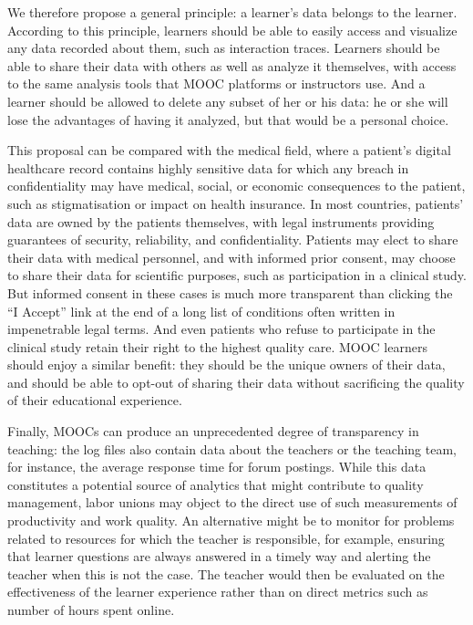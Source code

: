 
We therefore propose a general principle: a learner's data belongs to the learner.  According to
this principle, learners should be able to easily access and visualize any data recorded about them,
such as interaction traces.  Learners should be able to share their data with others as well as
analyze it themselves, with access to the same analysis tools that MOOC platforms or instructors
use.  And a learner should be allowed to delete any subset of her or his data: he or she will lose
the advantages of having it analyzed, but that would be a personal choice.


This proposal can be compared with the medical field, where a patient's
digital healthcare record contains highly sensitive data for which any
breach in confidentiality may have medical, social, or economic
consequences to the patient,
such as stigmatisation or impact on health insurance. 
In most countries, patients' data are owned by the
patients themselves, with legal instruments providing guarantees of
security, reliability, and confidentiality. Patients may elect to share
their data with  medical personnel, and with informed prior consent, may
choose to share their data for scientific purposes,
such as participation in a clinical study. But informed consent in these
cases is much more transparent than clicking the ``I Accept'' link at
the end of a long list of conditions often written in impenetrable legal
terms. 
And even patients who refuse to participate in the
clinical study retain their right to the highest quality care.
MOOC learners should enjoy a similar benefit: they
should be the unique owners of their data, and should be able to
opt-out of sharing their data without sacrificing the quality
of their educational experience.

Finally, MOOCs can
produce an unprecedented degree of transparency in teaching:  the log
files also contain data about the teachers or the 
teaching team, for instance, the average response time for forum
postings.  While this data constitutes a potential source of
analytics that might contribute to quality management,
labor unions may object to the direct use of such
measurements of productivity and work quality. An alternative might be
to monitor for problems related to resources for which the teacher is
responsible, for example, ensuring that learner questions are always
answered in a timely way and 
alerting the teacher when this is not the case.  The teacher would then
be evaluated on the effectiveness of the learner experience rather than on
direct metrics such as number of hours spent online.

